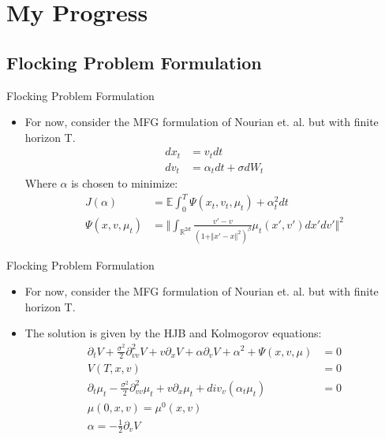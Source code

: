 \documentclass{beamer}
\begin{document}
\section{My Progress}

\subsection{Flocking Problem Formulation}

\begin{frame}{Flocking Problem Formulation}
	\begin{itemize}
		\item {
			For now, consider the MFG formulation of Nourian et. al. but with finite horizon T.
		}
						\begin{equation}
						\begin{split}
						dx_t&=v_tdt\\
						dv_t&=\alpha_tdt+\sigma dW_t
						\end{split}
						\end{equation}
						Where $\alpha$ is chosen to minimize:
						\begin{equation}
						\begin{split}
						J(\alpha)&=\mathbb{E} \int_0^T \Psi(x_t,v_t,\mu_t)+\alpha_t^2 dt \\
						\Psi(x,v,\mu_t)&=\Vert\int_{\mathbb{R}^{2d}}\frac{v'-v}{(1+\Vert x'-x \Vert^2)^\beta}\mu_t(x',v')dx'dv' \Vert^2
						\end{split}
						\end{equation}
	\end{itemize}
\end{frame}

\begin{frame}{Flocking Problem Formulation}
	\begin{itemize}
		\item {
			For now, consider the MFG formulation of Nourian et. al. but with finite horizon T.
		}
		\item {
			The solution is given by the HJB and Kolmogorov equations:
			\begin{equation}
			\begin{split}
			\partial_t V+\frac{\sigma^2}{2}\partial^2_{vv} V+ v \partial_x V+ \alpha \partial_v V+\alpha^2+\Psi(x,v,\mu)&=0 \\
			V(T,x,v)&=0 \\
			\partial_t \mu_t-\frac{\sigma^2}{2}\partial^2_{vv} \mu_t + v \partial_x \mu_t +div_v(\alpha_t \mu_t) &=0 \\
			\mu(0,x,v)=\mu^0(x,v)& \\
			\alpha=-\frac{1}{2}\partial_v V&
			\end{split}
			\end{equation}
		}
	\end{itemize}
\end{frame}
\end{document}
